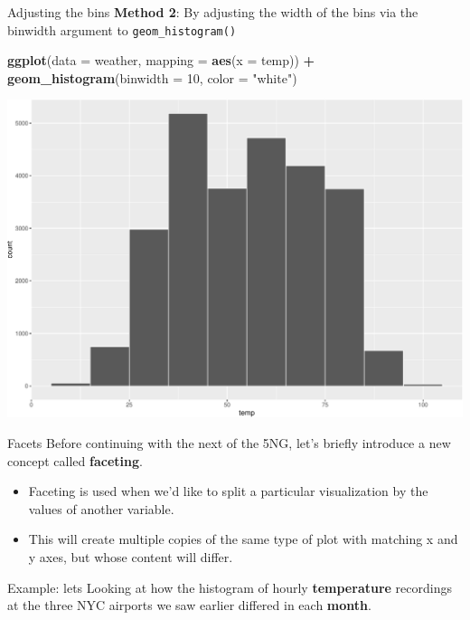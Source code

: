 \documentclass[
  ignorenonframetext,
]{beamer}
\newenvironment{Shaded}{\begin{snugshade}}{\end{snugshade}}
\newcommand{\AttributeTok}[1]{\textcolor[rgb]{0.13,0.29,0.53}{#1}}
\newcommand{\DecValTok}[1]{\textcolor[rgb]{0.00,0.00,0.81}{#1}}
\newcommand{\FunctionTok}[1]{\textcolor[rgb]{0.13,0.29,0.53}{\textbf{#1}}}
\newcommand{\NormalTok}[1]{#1}
\newcommand{\SpecialCharTok}[1]{\textcolor[rgb]{0.81,0.36,0.00}{\textbf{#1}}}
\newcommand{\StringTok}[1]{\textcolor[rgb]{0.31,0.60,0.02}{#1}}
\begin{document}
\begin{frame}[fragile]{Adjusting the bins}
\protect\hypertarget{adjusting-the-bins-1}{}
\textbf{Method 2}: By adjusting the width of the bins via the binwidth
argument to \texttt{geom\_histogram()}

\tiny

\begin{Shaded}
\begin{Highlighting}[]
\FunctionTok{ggplot}\NormalTok{(}\AttributeTok{data =}\NormalTok{ weather, }\AttributeTok{mapping =} \FunctionTok{aes}\NormalTok{(}\AttributeTok{x =}\NormalTok{ temp)) }\SpecialCharTok{+}
  \FunctionTok{geom\_histogram}\NormalTok{(}\AttributeTok{binwidth =} \DecValTok{10}\NormalTok{, }\AttributeTok{color =} \StringTok{"white"}\NormalTok{)}
\end{Highlighting}
\end{Shaded}

\begin{center}\includegraphics[width=0.7\linewidth,height=0.5\textheight]{Week2_files/figure-beamer/unnamed-chunk-30-1} \end{center}
\normalsize
\end{frame}

\begin{frame}{Facets}
\protect\hypertarget{facets}{}
Before continuing with the next of the 5NG, let's briefly introduce a
new concept called \textbf{faceting}.

\begin{itemize}
\item
  Faceting is used when we'd like to split a particular visualization by
  the values of another variable.
\item
  This will create multiple copies of the same type of plot with
  matching x and y axes, but whose content will differ.
\end{itemize}

Example: lets Looking at how the histogram of hourly
\textbf{temperature} recordings at the three NYC airports we saw earlier
differed in each \textbf{month}.
\end{frame}
\end{document}
